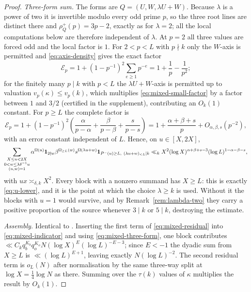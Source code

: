 \documentclass[11pt]{article}
\begin{document}
\begin{proof}
\emph{Three-form sum.} The forms are \(Q=(U,W,\lambda U+W)\). Because
\(\lambda\) is a power of two it is invertible modulo every odd prime \(p\),
so the three root lines are distinct there and \(\rho_Q^+(p)=3p-2\), exactly
as for \(\lambda=2\); all the local computations below are therefore
independent of \(\lambda\). At \(p=2\) all three values are forced odd and the
local factor is \(1\). For \(2<p<L\) with
\(p\nmid k\) only the \(W\)-axis is permitted and \eqref{eq:axis-density}
gives the exact factor
\begin{equation}\label{eq:mixed-small-factor}
 \mathcal E_p=1+(1-p^{-1})^2\sum_{e\geq1}p^{-e}=1+\frac1p-\frac1{p^2};
\end{equation}
for the finitely many \(p\mid k\) with \(p<L\) the \(\lambda U+W\)-axis is permitted
up to valuation \(v_p(\kappa)\leq v_p(k)\), which multiplies
\eqref{eq:mixed-small-factor} by a factor between \(1\) and \(3/2\)
(certified in the supplement), contributing an \(O_k(1)\) constant. For
\(p\geq L\) the complete factor is
\begin{equation}\label{eq:mixed-large-factor}
 \mathcal E_p=1+(1-p^{-1})^2
 \left(\frac{\alpha}{p-\alpha}+\frac{\beta}{p-\beta}+\frac{s}{p-s}\right)
 =1+\frac{\alpha+\beta+s}{p}+O_{\alpha,\beta,s}(p^{-2}),
\end{equation}
with an error constant independent of \(L\). Hence, on \(u\in[X,2X]\),
\begin{equation}\label{eq:mixed-three-form}
 \sum_{\substack{X\leq u<2X\\0<w\leq\lambda\delta^{-1}u\\(u,w)=1}}
 \alpha^{\Omega(u)}\mathbf 1_{2\nmid w}\beta^{\Omega_{\geq L}(w)}s^{\Omega(\lambda u+w)}
 \mathbf 1_{P^-(u)\geq L,\ (\lambda u+w)_{<L}\mid k}
 \ll_k X^2(\log X)^{\alpha+\beta+s-3}(\log L)^{1-\alpha-\beta-s},
\end{equation}
with \(ux\asymp_{\delta,k}X^2\). Every block with a nonzero summand has
\(X\geq L\): this is exactly \eqref{eq:u-lower}, and it is the point at which
the choice \(\lambda\geq k\) is used. Without it the blocks with \(u=1\) would
survive, and by Remark~\ref{rem:lambda-two} they carry a positive proportion
of the source whenever \(3\mid k\) or \(5\mid k\), destroying the estimate.

\emph{Assembly.} Identical to \cite[Prop.~5.2]{DellaPietra2026}. Inserting
the first term of \eqref{eq:mixed-residual} into
\eqref{eq:mixed-indicator} and using \eqref{eq:mixed-three-form}, one block
contributes \(\ll C_kq_b^{K_b}q_o^{K_o}N(\log X)^{E}(\log L)^{-E-3}\); since
\(E<-1\) the dyadic sum from \(X\geq L\) is \(\ll(\log L)^{E+1}\), leaving
exactly \(N(\log L)^{-2}\). The second residual term is \(o_L(N)\) after
normalisation by the same three-way split at \(\log X=\frac14\log N\) as
there. Summing over the \(\tau(k)\) values of \(\kappa\) multiplies the
result by \(O_k(1)\).
\end{proof}
\end{document}
